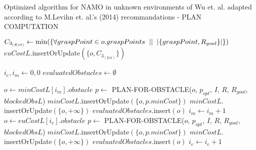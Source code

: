 \begin{algorithm}[H]

  \caption{Optimized algorithm for NAMO in unknown environments of Wu et. al. adapted according to M.Levihn et. al.'s (2014) recommandations - PLAN COMPUTATION}

  \label{alg:02-levihn-makeplan}

  \begin{algorithmic}[1]


          \State $C_{3_{(Est)}} \gets \min(\{\forall graspPoint \in o.graspPoints \hspace{0.2cm} || \hspace{0.2cm} |\{graspPoint, R_{goal}\}|\})$
          \State $euCostL$.insertOrUpdate$(\{o, C_{3_{(Est)}}\})$
      \EndFor

      \State $i_{e}, i_{m} \gets 0 , 0$ 
      \State $evaluatedObstacles \gets \emptyset$ 

       
         
          \State $o \gets minCostL[i_{m}].obstacle$
            \State $p \gets$ PLAN-FOR-OBSTACLE($o$, $p_{opt}$, $I$, $R$, $R_{goal}$, $blockedObsL$)
              \State $minCostL.$insertOrUpdate$(\{o, p.minCost\})$
            \Else
              \State $minCostL.$insertOrUpdate$(\{o, +\infty\})$
            \EndIf
            \State $evaluatedObstacles.$insert$(o)$
          \EndIf
          \State $i_{m} \gets i_{m} + 1$
        \Else
           
          \State $o \gets euCostL[i_{e}].obstacle$
              \State $p \gets$ PLAN-FOR-OBSTACLE($o$, $p_{opt}$, $I$, $R$, $R_{goal}$, $blockedObsL$)
                \State $minCostL.$insertOrUpdate$(\{o, p.minCost\})$
              \Else {}
                \State $minCostL.$insertOrUpdate$(\{o, +\infty\})$
              \EndIf
              \State $evaluatedObstacles.$insert$(o)$
            \EndIf
          \EndIf
          \State $i_{e} \gets i_{e} + 1$
        \EndIf
      \EndWhile
    \EndProcedure
  \end{algorithmic}
\end{algorithm}
